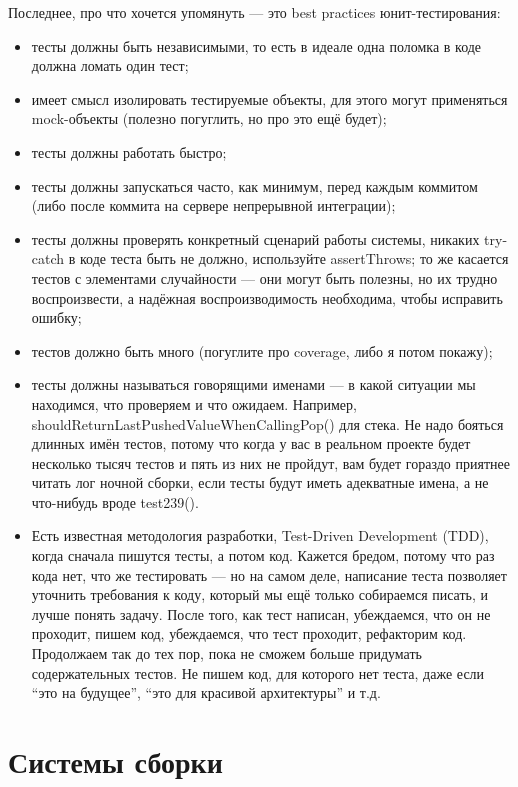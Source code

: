 \documentclass[a5paper]{article}
\begin{document}
Последнее, про что хочется упомянуть --- это best practices юнит-тестирования:

\begin{itemize}
	\item тесты должны быть независимыми, то есть в идеале одна поломка в коде должна ломать один тест;
	\item имеет смысл изолировать тестируемые объекты, для этого могут применяться mock-объекты (полезно погуглить, но про это ещё будет);
	\item тесты должны работать быстро;
	\item тесты должны запускаться часто, как минимум, перед каждым коммитом (либо после коммита на сервере непрерывной интеграции);
	\item тесты должны проверять конкретный сценарий работы системы, никаких try-catch в коде теста быть не должно, используйте assertThrows; то же касается тестов с элементами случайности --- они могут быть полезны, но их трудно воспроизвести, а надёжная воспроизводимость необходима, чтобы исправить ошибку;
	\item тестов должно быть много (погуглите про coverage, либо я потом покажу);
	\item тесты должны называться говорящими именами --- в какой ситуации мы находимся, что проверяем и что ожидаем. Например, shouldReturnLastPushedValueWhenCallingPop() для стека. Не надо бояться длинных имён тестов, потому что когда у вас в реальном проекте будет несколько тысяч тестов и пять из них не пройдут, вам будет гораздо приятнее читать лог ночной сборки, если тесты будут иметь адекватные имена, а не что-нибудь вроде test239().
	\item Есть известная методология разработки, Test-Driven Development (TDD), когда сначала пишутся тесты, а потом код. Кажется бредом, потому что раз кода нет, что же тестировать --- но на самом деле, написание теста позволяет уточнить требования к коду, который мы ещё только собираемся писать, и лучше понять задачу. После того, как тест написан, убеждаемся, что он не проходит, пишем код, убеждаемся, что тест проходит, рефакторим код. Продолжаем так до тех пор, пока не сможем больше придумать содержательных тестов. Не пишем код, для которого нет теста, даже если ``это на будущее'', ``это для красивой архитектуры'' и т.д.
\end{itemize}

\section{Системы сборки}
\end{document}
